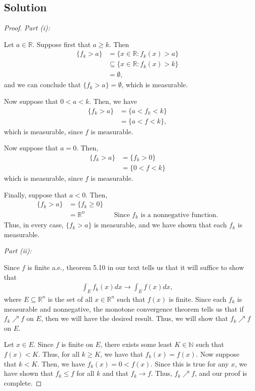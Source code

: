 \documentclass[10pt,a4paper]{article}
\makeatletter
\theoremstyle{theorem}
\newcommand{\proofpart}[2]{%
  \par
  \addvspace{\medskipamount}%
  \noindent\emph{Part #1: #2}\par\nobreak
  \addvspace{\smallskipamount}%
  \@afterheading
}
\theoremstyle{definition}
\makeatother
\begin{document}
\subsection*{Solution}
\begin{proof}
\proofpart{(i)}{} Let $a \in \mathbb{R}$. Suppose first that $a \geq k$. Then
\begin{align*}
\{f_k > a \} &= \{x \in  \mathbb{R}: f_k(x) > a \}\\
&\subseteq \{x \in  \mathbb{R}: f_k(x) > k \}\\
&= \emptyset,
\end{align*}
and we can conclude that $\{f_k > a \} = \emptyset$, which is measurable.

Now suppose that $0 < a < k$. Then, we have
\begin{align*}
\{f_k > a \} &= \{a < f_k <k \}\\
&= \{a < f < k \},
\end{align*}
which is measurable, since $f$ is measurable. 

Now suppose that $a = 0$. Then,
\begin{align*}
\{f_k > a \} &= \{f_k > 0 \}\\
&= \{0 < f < k \} 
\end{align*}
which is measurable, since $f$ is measurable. 

Finally,  suppose that $a < 0$. Then,
\begin{align*}
\{f_k > a \} &= \{f_k \geq 0 \}\\
&= \mathbb{R}^n &&\text{Since } f_k \text{ is a nonnegative function.}
\end{align*}
Thus, in every case, $\{f_k > a \}$ is measurable, and we have shown that each $f_k$ is measurable.

\proofpart{(ii)}{} 
Since $f$ is finite a.e., theorem 5.10 in our text tells us that it will suffice to show that
\begin{align*}
\int_{E} f_k(x)dx \to \int_{E} f(x)dx,
\end{align*}
where $E \subseteq \mathbb{R}^n$ is the set of all $x \in \mathbb{R}^n$ such that $f(x)$ is finite. Since each $f_k$ is measurable and nonnegative, the monotone convergence theorem tells us that if $f_k \nearrow f$ on $E$, then we will have the desired result. Thus, we will show that $f_k \nearrow f$ on $E$. 

Let $x \in E$. Since $f$ is finite on $E$, there exists some least $K \in \mathbb{N}$ such that $f(x) < K$. Thus, for all $k \geq K$, we have that $f_k(x) = f(x)$. Now suppose that $k < K$. Then, we have $f_k(x) = 0 < f(x)$. Since this is true for any $x$, we have shown that $f_k \leq f$ for all $k$ and that $f_k \to f$. Thus, $f_k \nearrow f$, and our proof is complete.
\end{proof}
\end{document}
